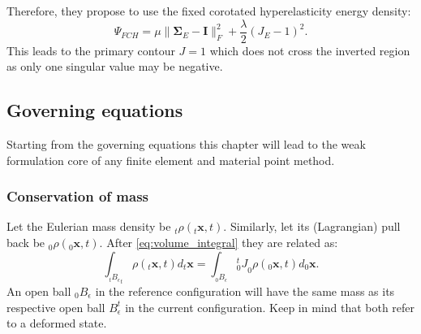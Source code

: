 \documentclass[m,times]{cgMA}
\begin{document}
Therefore, they propose to use the fixed corotated hyperelasticity energy density:
\begin{equation}
  \Psi_{FCH} = \mu \|\boldsymbol{\Sigma}_E - \boldsymbol{I}\|^2_F + \frac{\lambda}{2}(J_E-1)^2.
\end{equation}
This leads to the primary contour $J=1$ which does not cross the inverted region as only one singular value may be negative.
\begin{flushright}\cite{MPM:INVERT}\end{flushright}
\subsection{Governing equations}
Starting from the governing equations this chapter will lead to the weak formulation core of any finite element and material point method.
\subsubsection{Conservation of mass}
Let the Eulerian mass density be $_t\rho(_t\boldsymbol{x},t)$. Similarly, let its (Lagrangian) pull back be $_0\rho(_0\boldsymbol{x},t)$.
After \ref{eq:volume_integral} they are related as:
\begin{equation} \label{eq:density_pull_back}
  \int _ {_tB _ { \epsilon }}_t\rho(_t\boldsymbol{x},t)d_t\boldsymbol{x} =   \int _ {_0B _ { \epsilon }} {^t_0J}_0\rho(_0\boldsymbol{x},t) d_0\boldsymbol{x}.
\end{equation}
An open ball $ _ { 0 }B _ { \epsilon } $ in the reference configuration will have the same mass as its respective open ball $B_{\epsilon}^t$ in the current configuration. Keep in mind that both refer to a deformed state.
\end{document}
